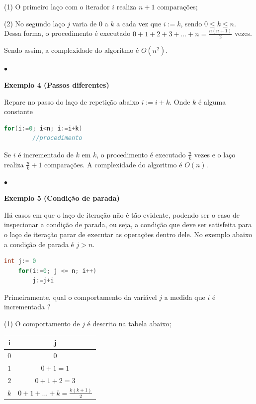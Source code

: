 (1) O primeiro laço com o iterador $i$ realiza $n+1$ comparações;

(2) No segundo laço $j$ varia de $0$ a $k$ a cada vez que $i:=k$, sendo $0\leq k\leq n$. Dessa forma, o procedimento é executado $0+1+2+3+...+n = \frac{n(n+1)}{2}$ vezes.

Sendo assim, a complexidade do algoritmo é $O(n^2)$.

{\raggedleft $\bullet$ \par}

\textbf{Exemplo 4 (Passos diferentes)}

Repare no passo do laço de repetição abaixo $i:=i+k$. Onde $k$ é alguma constante

\begin{lstlisting}[language=C, frame=single]
    for(i:=0; i<n; i:=i+k)
        //procedimento
\end{lstlisting}

Se $i$ é incrementado de $k$ em $k$, o procedimento é executado $\frac{n}{k}$ vezes e o laço realiza $\frac{n}{k}+1$ comparações. A complexidade do algoritmo é $O(n)$.

{\raggedleft $\bullet$ \par}

\textbf{Exemplo 5 (Condição de parada)}

Há casos em que o laço de iteração não é tão evidente, podendo ser o caso de inspecionar a condição de parada, ou seja, a condição que deve ser satisfeita para o laço de iteração parar de executar as operações dentro dele. No exemplo abaixo a condição de parada é $j > n$.

\begin{lstlisting}[language=C, frame=single]
    int j:= 0
    for(i:=0; j <= n; i++)
        j:=j+i
\end{lstlisting}
Primeiramente, qual o comportamento da variável $j$ a medida que $i$ é incrementada ?

(1) O comportamento de $j$ é descrito na tabela abaixo;

\newpage
 
\begin{table}
  \centering
  \begin{tabular}{cc}
    \textbf{i} & \textbf{j} \\
    \hline
    $0$ &  $0$ \\
    $1$ &  $0+1 = 1$ \\
    $2$ & $0+1+2 = 3$ \\
    $k$ &  $0+1+...+k = \frac{k(k+1)}{2}$ \\
  \end{tabular}
\end{table}

